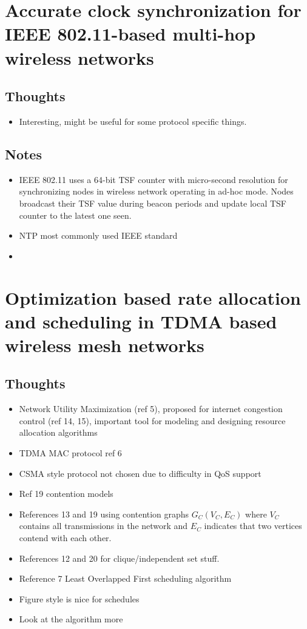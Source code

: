\documentclass{article}
\begin{document}
\section{Accurate clock synchronization for IEEE 802.11-based multi-hop wireless networks}
\subsection{Thoughts}
\begin{itemize}
    \item Interesting, might be useful for some protocol specific things.
\end{itemize}


\subsection{Notes}
\begin{itemize}
    \item IEEE 802.11 uses a 64-bit TSF counter with micro-second resolution for synchronizing nodes in wireless network operating in ad-hoc mode.  Nodes broadcast their TSF value during beacon periods and update local TSF counter to the latest one seen.
    \item NTP most commonly used IEEE standard
    \item 
\end{itemize}

\section{Optimization based rate allocation and scheduling in TDMA based wireless mesh networks}
\subsection{Thoughts}
\begin{itemize}
    \item Network Utility Maximization (ref 5), proposed for internet congestion control (ref 14, 15), important tool for modeling and designing resource allocation algorithms
    \item TDMA MAC protocol ref 6
    \item CSMA style protocol not chosen due to difficulty in QoS support
    \item Ref 19 contention models
    \item References 13 and 19 using contention graphs $G_C(V_C, E_C)$ where $V_C$ contains all transmissions in the network and $E_C$ indicates that two vertices contend with each other.
    \item References 12 and 20 for clique/independent set stuff.
    \item Reference 7 Least Overlapped First scheduling algorithm
    \item Figure style is nice for schedules
    \item Look at the algorithm more
\end{itemize}
\end{document}
